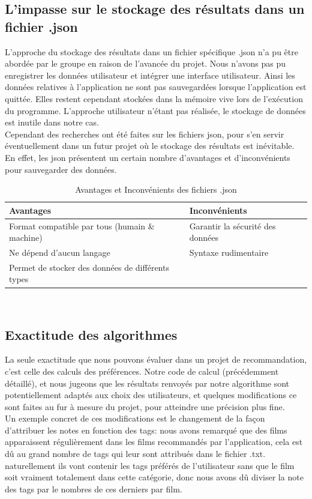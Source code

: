 \documentclass[light]{ceri}
\begin{document}
\subsection{L'impasse sur le stockage des résultats dans un fichier .json}
\indent L'approche du stockage des résultats dans un fichier spécifique .json n'a pu être abordée par le groupe en raison de l'avancée du projet. Nous n'avons pas pu enregistrer les données utilisateur et intégrer une interface utilisateur. Ainsi les données relatives à l'application ne sont pas sauvegardées lorsque l'application est quittée. Elles restent cependant stockées dans la mémoire vive lors de l'exécution du programme. L'approche utilisateur n'étant pas réalisée, le stockage de données est inutile dans notre cas.\\
\indent Cependant des recherches ont été faites sur les fichiers json, pour s'en servir éventuellement dans un futur projet où le stockage des résultats est inévitable. En effet, les json présentent un certain nombre d'avantages et d'inconvénients pour sauvegarder des données. 
\begin{table}[!h]

    \centering
    \begin{tabular}{|p{8cm}|p{8cm}|}
    \hline
        \rowcolor{yellow} Avantages  & Inconvénients   \tabularnewline \hline
       Format compatible par tous (humain \& machine)  & Garantir la sécurité des données \tabularnewline \hline
       Ne dépend d'aucun langage &  Syntaxe rudimentaire \tabularnewline \hline
       Permet de stocker des données de différents types  &   \tabularnewline \hline
  
        
    \end{tabular}
    \caption{Avantages et Inconvénients des fichiers .json}
    \label{table2:json}
\end{table} \\




	
\subsection{Exactitude des algorithmes}
  La seule exactitude que nous pouvons évaluer dans un projet de recommandation, c'est celle des calculs des préférences. Notre code de calcul (précédemment détaillé), et nous jugeons que les résultats renvoyés par notre algorithme sont potentiellement adaptés aux choix des utilisateurs, et quelques modifications ce sont faites au fur à mesure du projet, pour atteindre une précision plus fine.\\
  \indent Un exemple concret de ces modifications est le changement de la façon d'attribuer les notes en fonction des tags: nous avons remarqué que des films  apparaissent régulièrement dans les films recommandés par l'application, cela est dû au grand nombre de tags qui leur sont attribués dans le fichier .txt. naturellement ils vont contenir les tags préférés de l'utilisateur sans que le film soit vraiment totalement dans cette catégorie, donc nous avons dû diviser la note des tags par le nombres de ces derniers par film.
    
\end{document}
